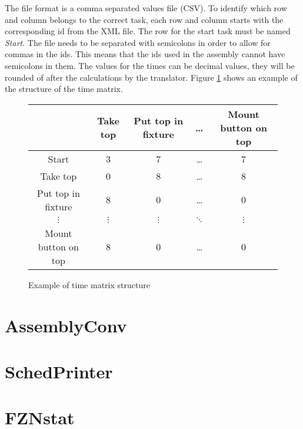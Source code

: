 The file format is a comma separated values file (CSV). To identify which row and column belongs to the correct task, each row and column starts with the corresponding id from the XML file. The row for the start task must be named \emph{Start}. The file needs to be separated with semicolons in order to allow for commas in the ids. This means that the ids used in the assembly cannot have semicolons in them. The values for the times can be decimal values, they will be rounded of after the calculations by the translator. Figure \ref{fig:time_matrix} shows an example of the structure of the time matrix.

\begin{figure}[h]
\begin{tabular}{c|c|c|c|c}
& Take top & Put top in fixture & \dots & Mount button on top\\\hline
Start & 3 & 7 & \dots & 7\\\hline
Take top & 0 & 8 & \dots & 8\\\hline
Put top in fixture & 8 & 0 & \dots & 0\\\hline
$\vdots$ & $\vdots$ & $\vdots$ & $\ddots$ & $\vdots$\\\hline
Mount button on top & 8 & 0 & \dots & 0
\end{tabular}
\caption{Example of time matrix structure}
\label{fig:time_matrix}
\end{figure}

\section{AssemblyConv}
\section{SchedPrinter}
\section{FZNstat}